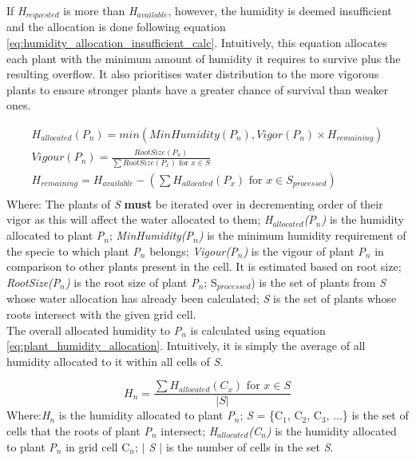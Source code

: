If \textit{H$_{requested}$} is more than \textit{H$_{available}$}, however, the humidity is deemed insufficient and the allocation is done following equation \ref{eq:humidity_allocation_insufficient_calc}. Intuitively, this equation allocates each plant with the minimum amount of humidity it requires to survive plus the resulting overflow. It also prioritises water distribution to the more vigorous plants to ensure stronger plants have a greater chance of survival than weaker ones.

\begin{equation}
\begin{split}
H_{allocated}(P_{n}) = min(MinHumidity(P_{n}), Vigor(P_{n}) \times H_{remaining}) \\
Vigour(P_{n}) =  \frac{RootSize(P_{n})}{\sum RootSize(P_{x}) \text{ for } x \in S}\\
H_{remaining} = H_{available} - (\sum H_{allocated}(P_{x})  \text{ for } x \in S_{processed})\\
\end{split}
\label{eq:humidity_allocation_insufficient_calc}
\end{equation}
Where: The plants of \textit{S} \textbf{must} be iterated over in decrementing order of their vigor as this will affect the water allocated to them; \textit{H$_{allocated}$(P$_{n}$)} is the humidity allocated to plant \textit{P$_{n}$}; \textit{MinHumidity(P$_{n}$)} is the minimum humidity requirement of the specie to which plant \textit{P$_{n}$} belongs; \textit{Vigour(P$_{n}$)} is the vigour of plant \textit{P$_{n}$} in comparison to other plants present in the cell. It is estimated based on root size; \textit{RootSize(P$_{n}$)} is the root size of plant \textit{P$_{n}$}; S$_{processed}$) is the set of plants from \textit{S} whose water allocation has already been calculated; \textit{S} is the set of plants whose roots intersect with the given grid cell.\\

The overall allocated humidity to \textit{P$_{n}$} is calculated using equation \ref{eq:plant_humidity_allocation}. Intuitively, it is simply the average of all humidity allocated to it within all cells of \textit{S}.

\begin{equation}
H_{n} = \frac{\sum H_{allocated}(C_{x}) \text{ for } x \in S}{| S |}
\label{eq:plant_humidity_allocation}
\end{equation}
Where:\textit{H$_{n}$} is the humidity allocated to plant \textit{P$_{n}$}; \textit{S} = \{C$_{1}$, C$_{2}$, C$_{3}$, ...\} is the set of cells that the roots of plant \textit{P$_{n}$} intersect; \textit{H$_{allocated}$(C$_{n}$)} is the humidity allocated to plant \textit{P$_{n}$} in grid cell C$_{n}$; \textit{$|$ S $|$} is the number of cells in the set \textit{S}.

